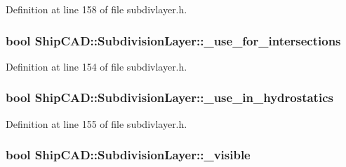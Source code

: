 Definition at line 158 of file subdivlayer.\-h.

\hypertarget{classShipCAD_1_1SubdivisionLayer_a8213aa3e02493472fb11949f595446f2}{
\subsubsection[{\-\_\-use\-\_\-for\-\_\-intersections}]{\setlength{\rightskip}{0pt plus 5cm}bool Ship\-C\-A\-D\-::\-Subdivision\-Layer\-::\-\_\-use\-\_\-for\-\_\-intersections\hspace{0.3cm}{\ttfamily [protected]}}}\label{classShipCAD_1_1SubdivisionLayer_a8213aa3e02493472fb11949f595446f2}


Definition at line 154 of file subdivlayer.\-h.

\hypertarget{classShipCAD_1_1SubdivisionLayer_ad36d65882f0c46ff1b3ced7d48c173f4}{
\subsubsection[{\-\_\-use\-\_\-in\-\_\-hydrostatics}]{\setlength{\rightskip}{0pt plus 5cm}bool Ship\-C\-A\-D\-::\-Subdivision\-Layer\-::\-\_\-use\-\_\-in\-\_\-hydrostatics\hspace{0.3cm}{\ttfamily [protected]}}}\label{classShipCAD_1_1SubdivisionLayer_ad36d65882f0c46ff1b3ced7d48c173f4}


Definition at line 155 of file subdivlayer.\-h.

\hypertarget{classShipCAD_1_1SubdivisionLayer_a2d606476aba40bbbfc115c449f46ac26}{
\subsubsection[{\-\_\-visible}]{\setlength{\rightskip}{0pt plus 5cm}bool Ship\-C\-A\-D\-::\-Subdivision\-Layer\-::\-\_\-visible\hspace{0.3cm}{\ttfamily [protected]}}}\label{classShipCAD_1_1SubdivisionLayer_a2d606476aba40bbbfc115c449f46ac26}


